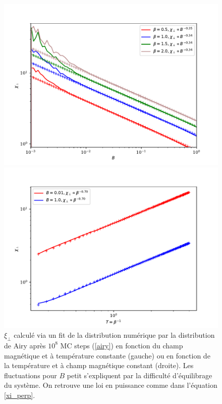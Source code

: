 \begin{figure}[h]
	\begin{minipage}[t]{0.5\linewidth}
		\includegraphics[width=\linewidth]{sosequi-laser/glau-chi.pdf}
	\end{minipage}%
	\begin{minipage}[t]{0.5\linewidth}
		\includegraphics[width=\linewidth]{sosequi-laser/glau-chi-temp.pdf}
	\end{minipage}
	\caption{$\xi_\perp$ calculé via un fit de la distribution numérique par la distribution de Airy après $10^8$ MC steps (\ref{airy}) en fonction du champ magnétique et à température constante (gauche) ou en fonction de la température et à champ magnétique constant (droite). Les fluctuations pour $B$ petit s'expliquent par la difficulté d'équilibrage du système. On retrouve une loi en puissance comme dans l'équation \ref{xi_perp}.}
	\label{expo_airy}
\end{figure}

